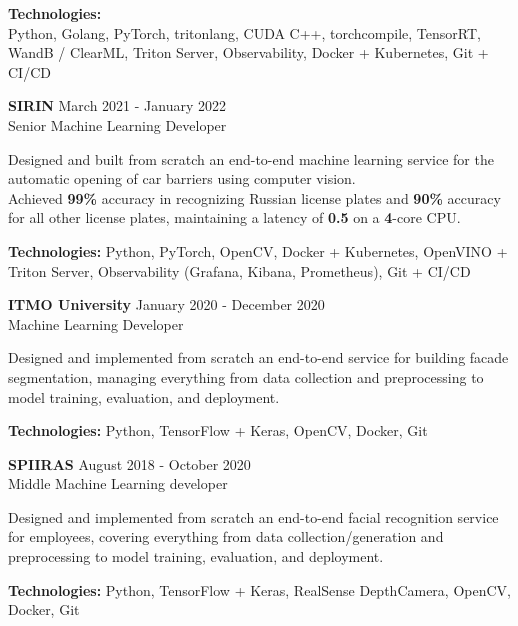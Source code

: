\textbf{Technologies:} \\
Python, Golang, PyTorch, tritonlang, CUDA C++, torchcompile, TensorRT, WandB / ClearML, Triton Server, Observability, Docker + Kubernetes, Git + CI/CD

\textbf{SIRIN} \hfill March 2021 - January 2022 \\
Senior Machine Learning Developer

Designed and built from scratch an end-to-end machine learning service for the automatic opening of car barriers using computer vision. \\
Achieved \textbf{99\%} accuracy in recognizing Russian license plates and \textbf{90\%} accuracy for all other license plates, maintaining a latency of \textbf{0.5} on a \textbf{4}-core CPU.

\textbf{Technologies:} Python, PyTorch, OpenCV, Docker + Kubernetes, OpenVINO + Triton Server, Observability (Grafana, Kibana, Prometheus), Git + CI/CD

\textbf{ITMO University} \hfill January 2020 - December 2020 \\
Machine Learning Developer

Designed and implemented from scratch an end-to-end service for building facade segmentation, managing everything from data collection and preprocessing to model training, evaluation, and deployment.

\textbf{Technologies:} Python, TensorFlow + Keras, OpenCV, Docker, Git

\textbf{SPIIRAS} \hfill August 2018 - October 2020 \\
Middle Machine Learning developer

Designed and implemented from scratch an end-to-end facial recognition service for employees, covering everything from data collection/generation and preprocessing to model training, evaluation, and deployment.

\textbf{Technologies:} Python, TensorFlow + Keras, RealSense DepthCamera, OpenCV, Docker, Git

\endinput

